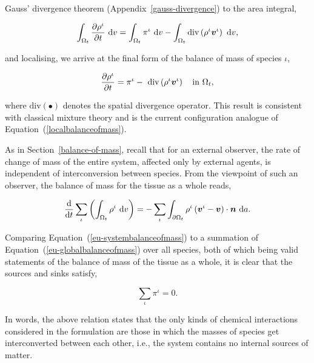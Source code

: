 \noindent Gauss' divergence theorem (Appendix~\ref{gauss-divergence})
to the area integral,

\begin{equation*}
\int_{\Omega_{t}} \frac{\partial \rho^{\iota}}{\partial t}
\ \mathrm{d}v = \int_{\Omega_{t}} \pi^{\iota} \ \mathrm{d}v -
\int_{\Omega_{t}} \mathrm{div} \left( \rho^{\iota} \mbox{\boldmath$ v$}^{\iota}\right)
\ \mathrm{d}v,
\end{equation*}

\noindent and localising, we arrive at the final form of the balance
of mass of species $\iota$,

\begin{equation}
\frac{\partial \rho^{\iota}}{\partial t} = \pi^{\iota} -\ \mathrm{div}
\left(\rho^{\iota} \mbox{\boldmath$ v$}^{\iota}\right) \quad \mathrm{in}\ \Omega_{t},
\label{eu-localbalanceofmass}
\end{equation}

\noindent where $\mathrm{div} (\bullet)$ denotes the spatial
divergence operator. This result is consistent with classical mixture
theory \citep{TruesdellToupin:60} and is the current configuration
analogue of Equation~(\ref{localbalanceofmass}).

As in Section~\ref{balance-of-mass}, recall that for an external
observer, the rate of change of mass of the entire system, affected
only by external agents, is independent of interconversion between
species. From the viewpoint of such an observer, the balance of mass
for the tissue as a whole reads,

\begin{equation}
\frac{\mathrm{\mathrm{d}}}{\mathrm{\mathrm{d}}t} \sum\limits_{\iota}
\left(\int_{\Omega_{t}} \rho^{\iota} \ \mathrm{d}v \right) =
-\sum\limits_{\iota} \int_{\partial \Omega_{t}} \rho^{\iota}
\left(\mbox{\boldmath$ v$}^{\iota} - \mbox{\boldmath$ v$}\right) \cdot \mbox{\boldmath$ n$}\ \mathrm{d}a.
\label{eu-systembalanceofmass}
\end{equation}

\noindent Comparing Equation~(\ref{eu-systembalanceofmass}) to a
summation of Equation~(\ref{eu-globalbalanceofmass}) over all species,
both of which being valid statements of the balance of mass of the
tissue as a whole, it is clear that the sources and sinks satisfy,

\begin{equation}
\sum\limits_{\iota}\pi^{\iota} = 0.
\label{eu-summationrelationmass}
\end{equation}

\noindent In words, the above relation states that the only kinds of
chemical interactions considered in the formulation are those in which
the masses of species get interconverted between each other, i.e.,
the system contains no internal sources of matter.

